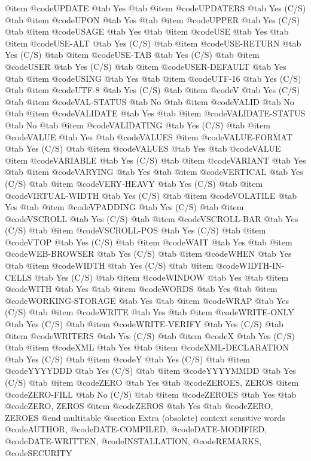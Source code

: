 @item @code{UPDATE} @tab Yes @tab 
@item @code{UPDATERS} @tab Yes	(C/S) @tab 
@item @code{UPON} @tab Yes @tab 
@item @code{UPPER} @tab Yes	(C/S) @tab 
@item @code{USAGE} @tab Yes @tab 
@item @code{USE} @tab Yes @tab 
@item @code{USE-ALT} @tab Yes	(C/S) @tab 
@item @code{USE-RETURN} @tab Yes	(C/S) @tab 
@item @code{USE-TAB} @tab Yes	(C/S) @tab 
@item @code{USER} @tab Yes	(C/S) @tab 
@item @code{USER-DEFAULT} @tab Yes @tab 
@item @code{USING} @tab Yes @tab 
@item @code{UTF-16} @tab Yes	(C/S) @tab 
@item @code{UTF-8} @tab Yes	(C/S) @tab 
@item @code{V} @tab Yes	(C/S) @tab 
@item @code{VAL-STATUS} @tab No @tab 
@item @code{VALID} @tab No @tab 
@item @code{VALIDATE} @tab Yes @tab 
@item @code{VALIDATE-STATUS} @tab No @tab 
@item @code{VALIDATING} @tab Yes	(C/S) @tab 
@item @code{VALUE} @tab Yes @tab @code{VALUES}
@item @code{VALUE-FORMAT} @tab Yes	(C/S) @tab 
@item @code{VALUES} @tab Yes @tab @code{VALUE}
@item @code{VARIABLE} @tab Yes	(C/S) @tab 
@item @code{VARIANT} @tab Yes @tab 
@item @code{VARYING} @tab Yes @tab 
@item @code{VERTICAL} @tab Yes	(C/S) @tab 
@item @code{VERY-HEAVY} @tab Yes	(C/S) @tab 
@item @code{VIRTUAL-WIDTH} @tab Yes	(C/S) @tab 
@item @code{VOLATILE} @tab Yes @tab 
@item @code{VPADDING} @tab Yes	(C/S) @tab 
@item @code{VSCROLL} @tab Yes	(C/S) @tab 
@item @code{VSCROLL-BAR} @tab Yes	(C/S) @tab 
@item @code{VSCROLL-POS} @tab Yes	(C/S) @tab 
@item @code{VTOP} @tab Yes	(C/S) @tab 
@item @code{WAIT} @tab Yes @tab 
@item @code{WEB-BROWSER} @tab Yes	(C/S) @tab 
@item @code{WHEN} @tab Yes @tab 
@item @code{WIDTH} @tab Yes	(C/S) @tab 
@item @code{WIDTH-IN-CELLS} @tab Yes	(C/S) @tab 
@item @code{WINDOW} @tab Yes @tab 
@item @code{WITH} @tab Yes @tab 
@item @code{WORDS} @tab Yes @tab 
@item @code{WORKING-STORAGE} @tab Yes @tab 
@item @code{WRAP} @tab Yes	(C/S) @tab 
@item @code{WRITE} @tab Yes @tab 
@item @code{WRITE-ONLY} @tab Yes	(C/S) @tab 
@item @code{WRITE-VERIFY} @tab Yes	(C/S) @tab 
@item @code{WRITERS} @tab Yes	(C/S) @tab 
@item @code{X} @tab Yes	(C/S) @tab 
@item @code{XML} @tab Yes @tab 
@item @code{XML-DECLARATION} @tab Yes	(C/S) @tab 
@item @code{Y} @tab Yes	(C/S) @tab 
@item @code{YYYYDDD} @tab Yes	(C/S) @tab 
@item @code{YYYYMMDD} @tab Yes	(C/S) @tab 
@item @code{ZERO} @tab Yes @tab @code{ZEROES, ZEROS}
@item @code{ZERO-FILL} @tab No	(C/S) @tab 
@item @code{ZEROES} @tab Yes @tab @code{ZERO, ZEROS}
@item @code{ZEROS} @tab Yes @tab @code{ZERO, ZEROES}
@end multitable
@section Extra (obsolete) context sensitive words
@code{AUTHOR}, @code{DATE-COMPILED}, @code{DATE-MODIFIED}, @code{DATE-WRITTEN}, @code{INSTALLATION}, @code{REMARKS}, @code{SECURITY}

